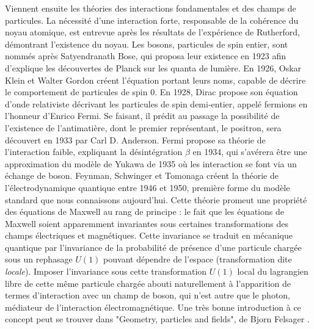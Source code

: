 		    Viennent ensuite les théories des interactions fondamentales et des champs de particules. La nécessité d'une interaction forte, responsable de la cohérence du noyau atomique, est entrevue après les résultats de l'expérience de Rutherford, démontrant l'existence du noyau. Les bosons, particules de spin entier, sont nommés après Satyendranath Bose, qui proposa leur existence en 1923 afin d'explique les découvertes de Planck sur les quanta de lumière\cite{Bose1924}. En 1926, Oskar Klein et Walter Gordon\cite{Klein1926,Gordon1926} créent l'équation portant leurs noms, capable de décrire le comportement de particules de spin 0. En 1928, Dirac propose son équation d'onde relativiste décrivant les particules de spin demi-entier, appelé fermions en l'honneur d'Enrico Fermi\cite{Dirac1928}. Se faisant, il prédit au passage la possibilité de l'existence de l'antimatière, dont le premier représentant, le positron, sera découvert en 1933 par Carl D. Anderson\cite{Anderson1933}. Fermi propose sa théorie de l'interaction faible, expliquant la désintégration $\beta$ en 1934\cite{Fermi1934}, qui s'avérera être une approximation du modèle de Yukawa de 1935\cite{Yukawa1935} où les interaction se font via un échange de boson. Feynman, Schwinger et Tomonaga\cite{Tomonaga1946,Schwinger1948,Feynman1998} créent la théorie de l'électrodynamique quantique entre 1946 et 1950, première forme du modèle standard que nous connaissons aujourd’hui. Cette théorie promeut une propriété des équations de Maxwell au rang de principe : le fait que les équations de Maxwell soient apparemment invariantes sous certaines transformations des champs électriques et magnétiques. Cette invariance se traduit en mécanique quantique par l'invariance de la probabilité de présence d'une particule chargée sous un rephasage $U(1)$ pouvant dépendre de l'espace (transformation dite \textit{locale}). Imposer l'invariance sous cette transformation $U(1)$ local du lagrangien libre de cette même particule chargée abouti naturellement à l'apparition de termes d'interaction avec un champ de boson, qui n'est autre que le photon, médiateur de l'interaction électromagnétique. Une très bonne introduction à ce concept peut se trouver dans "Geometry, particles and fields", de Bjorn Felsager \cite{felsager}.
		    
